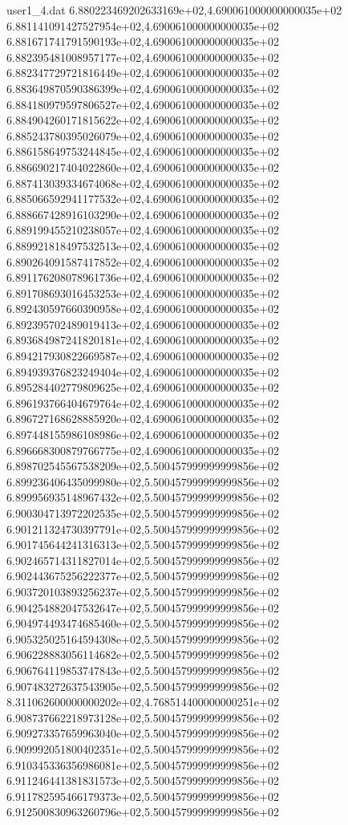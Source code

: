 \begin{filecontents}{user1_4.dat}
6.880223469202633169e+02,4.690061000000000035e+02
6.881141091427527954e+02,4.690061000000000035e+02
6.881671741791590193e+02,4.690061000000000035e+02
6.882395481008957177e+02,4.690061000000000035e+02
6.882347729721816449e+02,4.690061000000000035e+02
6.883649870590386399e+02,4.690061000000000035e+02
6.884180979597806527e+02,4.690061000000000035e+02
6.884904260171815622e+02,4.690061000000000035e+02
6.885243780395026079e+02,4.690061000000000035e+02
6.886158649753244845e+02,4.690061000000000035e+02
6.886690217404022860e+02,4.690061000000000035e+02
6.887413039334674068e+02,4.690061000000000035e+02
6.885066592941177532e+02,4.690061000000000035e+02
6.888667428916103290e+02,4.690061000000000035e+02
6.889199455210238057e+02,4.690061000000000035e+02
6.889921818497532513e+02,4.690061000000000035e+02
6.890264091587417852e+02,4.690061000000000035e+02
6.891176208078961736e+02,4.690061000000000035e+02
6.891708693016453253e+02,4.690061000000000035e+02
6.892430597660390958e+02,4.690061000000000035e+02
6.892395702489019413e+02,4.690061000000000035e+02
6.893684987241820181e+02,4.690061000000000035e+02
6.894217930822669587e+02,4.690061000000000035e+02
6.894939376823249404e+02,4.690061000000000035e+02
6.895284402779809625e+02,4.690061000000000035e+02
6.896193766404679764e+02,4.690061000000000035e+02
6.896727168628885920e+02,4.690061000000000035e+02
6.897448155986108986e+02,4.690061000000000035e+02
6.896668300879766775e+02,4.690061000000000035e+02
6.898702545567538209e+02,5.500457999999999856e+02
6.899236406435099980e+02,5.500457999999999856e+02
6.899956935148967432e+02,5.500457999999999856e+02
6.900304713972202535e+02,5.500457999999999856e+02
6.901211324730397791e+02,5.500457999999999856e+02
6.901745644241316313e+02,5.500457999999999856e+02
6.902465714311827014e+02,5.500457999999999856e+02
6.902443675256222377e+02,5.500457999999999856e+02
6.903720103893256237e+02,5.500457999999999856e+02
6.904254882047532647e+02,5.500457999999999856e+02
6.904974493474685460e+02,5.500457999999999856e+02
6.905325025164594308e+02,5.500457999999999856e+02
6.906228883056114682e+02,5.500457999999999856e+02
6.906764119853747843e+02,5.500457999999999856e+02
6.907483272637543905e+02,5.500457999999999856e+02
8.311062600000000202e+02,4.768514400000000251e+02
6.908737662218973128e+02,5.500457999999999856e+02
6.909273357659963040e+02,5.500457999999999856e+02
6.909992051800402351e+02,5.500457999999999856e+02
6.910345336356986081e+02,5.500457999999999856e+02
6.911246441381831573e+02,5.500457999999999856e+02
6.911782595466179373e+02,5.500457999999999856e+02
6.912500830963260796e+02,5.500457999999999856e+02

\end{filecontents}
